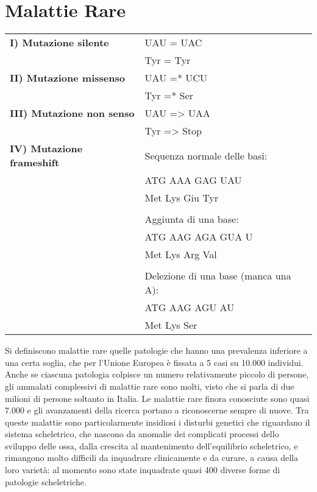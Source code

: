 \documentclass{article}
\begin{document}
\section{Malattie Rare}
\begin{center}
    \begin{tabular}{ll}
        \toprule
        \textbf{I) Mutazione silente} & UAU = UAC\\
         & Tyr = Tyr\\
        \midrule
        \textbf{II) Mutazione missenso} & UAU =* UCU\\
         & Tyr =* Ser\\
        \midrule
        \textbf{III) Mutazione non senso} & UAU => UAA\\
         & Tyr => Stop\\
        \midrule
        \textbf{IV) Mutazione frameshift} & Sequenza normale delle basi:\\
         & ATG AAA GAG UAU\\
         & Met Lys Giu Tyr\\
         &\\
         & Aggiunta di una base:\\
         & ATG AAG AGA GUA U\\
         & Met Lys Arg Val\\
         &\\
         & Delezione di una base (manca una A):\\
         & ATG AAG AGU AU\\
         & Met Lys Ser\\
        \bottomrule
    \end{tabular}
\end{center}
Si definiscono malattie rare quelle patologie che hanno una prevalenza inferiore a
una certa soglia, che per l'Unione Europea è fissata a 5 casi su 10.000 individui.
Anche se ciascuna patologia colpisce un numero relativamente piccolo di persone, gli
ammalati complessivi di malattie rare sono molti, visto che si parla di due milioni di
persone soltanto in Italia. Le malattie rare finora conosciute sono quasi 7.000 e gli
avanzamenti della ricerca portano a riconoscerne sempre di nuove. Tra queste
malattie sono particolarmente insidiosi i disturbi genetici che riguardano il sistema
scheletrico, che nascono da anomalie dei complicati processi dello sviluppo delle
ossa, dalla crescita al mantenimento dell'equilibrio scheletrico, e rimangono molto
difficili da inquadrare clinicamente e da curare, a causa della loro varietà: al
momento sono state inquadrate quasi 400 diverse forme di patologie scheletriche.\\
\end{document}

